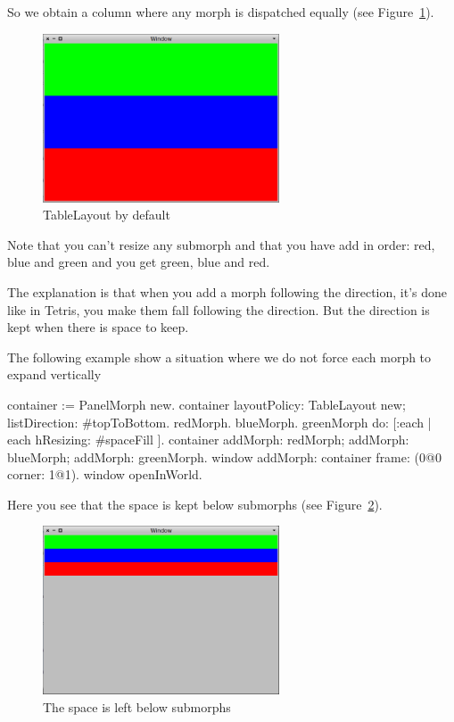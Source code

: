 \documentclass[a4paper,10pt,twoside]{book}
\begin{document}
So we obtain a column where any morph is dispatched equally (see Figure~\ref{fig:tableLayout1}).

\begin{figure}[ht]\centering
	\includegraphics[width=7cm]{TableLayout1}
	\caption{TableLayout by default}
	\label{fig:tableLayout1}
\end{figure}

Note that you can't resize any submorph and that you have add in order:
red, blue and green and you get 
green, blue and  red.

The explanation is that when you add a morph following the direction, it's done like in Tetris, you make them fall following the direction. But the direction is kept when there is space to keep.


The following example show a situation  where we do not force each morph to expand vertically
\begin{code}{}
container := PanelMorph new.
container 
	layoutPolicy: TableLayout new;
	listDirection: #topToBottom.
{ redMorph. blueMorph. greenMorph } do: [:each |
	each hResizing: #spaceFill ].
container 
	addMorph: redMorph;
	addMorph: blueMorph;
	addMorph: greenMorph.
window
	addMorph: container
	frame: (0@0 corner: 1@1).
window openInWorld.
\end{code}

Here you see that the space is kept below submorphs (see Figure~\ref{fig:tableLayout2}).

\begin{figure}[ht]\centering
	\includegraphics[width=7cm]{TableLayout2}
	\caption{The space is left below submorphs}
	\label{fig:tableLayout2}
\end{figure}
\end{document}
